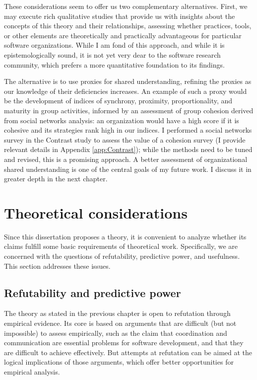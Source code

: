 These considerations seem to offer us two complementary alternatives. First, we may execute rich qualitative studies that provide us with insights about the concepts of this theory and their relationships, assessing whether practices, tools, or other elements are theoretically and practically advantageous for particular software organizations. While I am fond of this approach, and while it is epistemologically sound, it is not yet very dear to the software research community, which prefers a more quantitative foundation to its findings.

The alternative is to use proxies for shared understanding, refining the proxies as our knowledge of their deficiencies increases. An example of such a proxy would be the development of indices of synchrony, proximity, proportionality, and maturity in group activities, informed by an assessment of group cohesion derived from social networks analysis: an organization would have a high score if it is cohesive and its strategies rank high in our indices. I performed a social networks survey in the Contrast study to assess the value of a cohesion survey (I provide relevant details in Appendix \ref{app:Contrast}); while the methods need to be tuned and revised, this is a promising approach. A better assessment of organizational shared understanding is one of the central goals of my future work. I discuss it in greater depth in the next chapter.


\section{Theoretical considerations}

Since this dissertation proposes a theory, it is convenient to analyze whether its claims fulfill some basic requirements of theoretical work. Specifically, we are concerned with the questions of refutability, predictive power, and usefulness. This section addresses these issues.


\subsection{Refutability and predictive power}
\label{sec:Refutability}

The theory as stated in the previous chapter is open to refutation through empirical evidence. Its core is based on arguments that are difficult (but not impossible) to assess empirically, such as the claim that coordination and communication are essential problems for software development, and that they are difficult to achieve effectively. But attempts at refutation can be aimed at the logical implications of those arguments, which offer better opportunities for empirical analysis.

